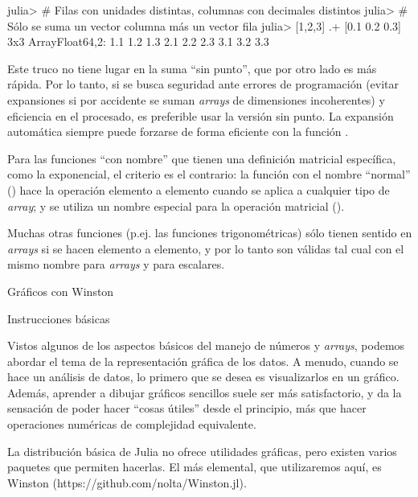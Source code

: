 ﻿\documentclass[spanish]{article}
\begin{document}
julia> # Filas con unidades distintas, columnas con decimales distintos
julia> # Sólo se suma un vector columna más un vector fila
julia> [1,2,3] .+ [0.1 0.2 0.3]
3x3 Array{Float64,2}:
 1.1 1.2 1.3
 2.1 2.2 2.3
 3.1 3.2 3.3

Este truco no tiene lugar en la suma ``sin punto'', que por otro lado es más rápida. Por lo tanto, si se busca seguridad ante errores de programación (evitar expansiones si por accidente se suman \emph{arrays} de dimensiones incoherentes) y eficiencia en el procesado, es preferible usar la versión sin punto. La expansión automática siempre puede forzarse de forma eficiente con la función .

Para las funciones ``con nombre'' que tienen una definición matricial específica, como la exponencial, el criterio es el contrario: la función con el nombre ``normal'' () hace la operación elemento a elemento cuando se aplica a cualquier tipo de \emph{array}; y se utiliza un nombre especial para la operación matricial ().

Muchas otras funciones (p.ej. las funciones trigonométricas) sólo tienen sentido en \emph{arrays} si se hacen elemento a elemento, y por lo tanto son válidas tal cual con el mismo nombre para \emph{arrays} y para escalares.




Gráficos con Winston

Instrucciones básicas

Vistos algunos de los aspectos básicos del manejo de números y \emph{arrays}, podemos abordar el tema de la representación gráfica de los datos. A menudo, cuando se hace un análisis de datos, lo primero que se desea es visualizarlos en un gráfico. Además, aprender a dibujar gráficos sencillos suele ser más satisfactorio, y da la sensación de poder hacer ``cosas útiles'' desde el principio, más que hacer operaciones numéricas de complejidad equivalente.

La distribución básica de Julia no ofrece utilidades gráficas, pero existen varios paquetes que permiten hacerlas. El más elemental, que utilizaremos aquí, es Winston (https://github.com/nolta/Winston.jl).%
\end{document}
